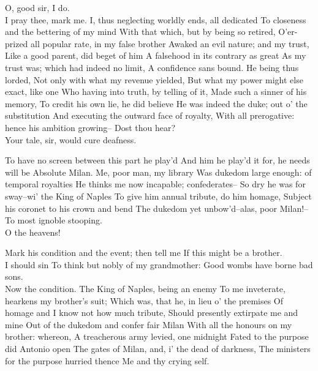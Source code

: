 \documentclass[11pt]{book}
\begin{document}
\2	O, good sir, I do. \\

\1	                  I pray thee, mark me.
	I, thus neglecting worldly ends, all dedicated
	To closeness and the bettering of my mind
	With that which, but by being so retired,
	O'er-prized all popular rate, in my false brother
	Awaked an evil nature; and my trust,
	Like a good parent, did beget of him
	A falsehood in its contrary as great
	As my trust was; which had indeed no limit,
	A confidence sans bound. He being thus lorded,
	Not only with what my revenue yielded,
	But what my power might else exact, like one
	Who having into truth, by telling of it,
	Made such a sinner of his memory,
	To credit his own lie, he did believe
	He was indeed the duke; out o' the substitution
	And executing the outward face of royalty,
	With all prerogative: hence his ambition growing--
	Dost thou hear? \\

\2	                  Your tale, sir, would cure deafness.

\1	To have no screen between this part he play'd
	And him he play'd it for, he needs will be
	Absolute Milan. Me, poor man, my library
	Was dukedom large enough: of temporal royalties
	He thinks me now incapable; confederates--
	So dry he was for sway--wi' the King of Naples
	To give him annual tribute, do him homage,
	Subject his coronet to his crown and bend
	The dukedom yet unbow'd--alas, poor Milan!--
	To most ignoble stooping. \\

\2	O the heavens!

\1	Mark his condition and the event; then tell me
	If this might be a brother. \\

\2	I should sin
	To think but nobly of my grandmother:
	Good wombs have borne bad sons. \\

\1	Now the condition.
	The King of Naples, being an enemy
	To me inveterate, hearkens my brother's suit;
	Which was, that he, in lieu o' the premises
	Of homage and I know not how much tribute,
	Should presently extirpate me and mine
	Out of the dukedom and confer fair Milan
	With all the honours on my brother: whereon,
	A treacherous army levied, one midnight
	Fated to the purpose did Antonio open
	The gates of Milan, and, i' the dead of darkness,
	The ministers for the purpose hurried thence
	Me and thy crying self. \\
                                    
\end{document}
